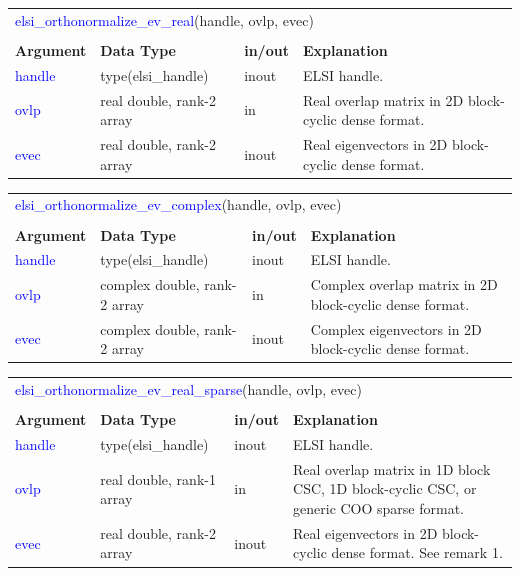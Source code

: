 \documentclass{report}
\newcommand{\tcb}[1]{\textcolor{blue}{#1}}
\begin{document}
\begin{tabular}[]{|p{20mm}|p{45mm}|p{15mm}|p{85mm}|}
\multicolumn{4}{l}{\tcb{elsi\_orthonormalize\_ev\_real}(handle, ovlp, evec)}\\
\multicolumn{4}{l}{}\\
\hline
\multicolumn{1}{|l|}{\textbf{Argument}} & \multicolumn{1}{l|}{\textbf{Data Type}} & \multicolumn{1}{l|}{\textbf{in/out}} & \multicolumn{1}{l|}{\textbf{Explanation}}\\
\hline
\tcb{handle} & type(elsi\_handle)        & inout & ELSI handle.\\
\hline
\tcb{ovlp}   & real double, rank-2 array & in    & Real overlap matrix in 2D block-cyclic dense format.\\
\hline
\tcb{evec}   & real double, rank-2 array & inout & Real eigenvectors in 2D block-cyclic dense format.\\
\hline
\end{tabular}

\begin{tabular}[]{|p{20mm}|p{45mm}|p{15mm}|p{85mm}|}
\multicolumn{4}{l}{\tcb{elsi\_orthonormalize\_ev\_complex}(handle, ovlp, evec)}\\
\multicolumn{4}{l}{}\\
\hline
\multicolumn{1}{|l|}{\textbf{Argument}} & \multicolumn{1}{l|}{\textbf{Data Type}} & \multicolumn{1}{l|}{\textbf{in/out}} & \multicolumn{1}{l|}{\textbf{Explanation}}\\
\hline
\tcb{handle} & type(elsi\_handle)           & inout & ELSI handle.\\
\hline
\tcb{ovlp}   & complex double, rank-2 array & in    & Complex overlap matrix in 2D block-cyclic dense format.\\
\hline
\tcb{evec}   & complex double, rank-2 array & inout & Complex eigenvectors in 2D block-cyclic dense format.\\
\hline
\end{tabular}

\begin{tabular}[]{|p{20mm}|p{45mm}|p{15mm}|p{85mm}|}
\multicolumn{4}{l}{\tcb{elsi\_orthonormalize\_ev\_real\_sparse}(handle, ovlp, evec)}\\
\multicolumn{4}{l}{}\\
\hline
\multicolumn{1}{|l|}{\textbf{Argument}} & \multicolumn{1}{l|}{\textbf{Data Type}} & \multicolumn{1}{l|}{\textbf{in/out}} & \multicolumn{1}{l|}{\textbf{Explanation}}\\
\hline
\tcb{handle} & type(elsi\_handle)        & inout & ELSI handle.\\
\hline
\tcb{ovlp}   & real double, rank-1 array & in    & Real overlap matrix in 1D block CSC, 1D block-cyclic CSC, or generic COO sparse format.\\
\hline
\tcb{evec}   & real double, rank-2 array & inout & Real eigenvectors in 2D block-cyclic dense format. See remark 1.\\
\hline
\end{tabular}
\end{document}
